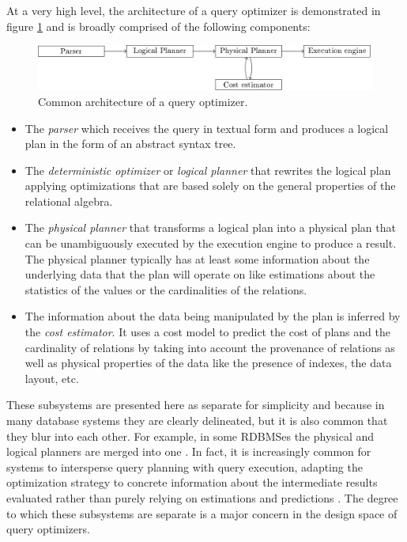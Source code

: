 At a very high level, the architecture of a query optimizer is
demonstrated in figure \ref{fig:optimizer_arch} and is broadly
comprised of the following components:

\begin{figure}[p]
\centering
\includegraphics[width=\textwidth]{./imgs/optimizer_architecture.pdf}
\caption{\label{fig:optimizer_arch}Common architecture of a query
  optimizer.}
\end{figure}

\begin{itemize}

\item The \emph{parser} which receives the query in textual form and
  produces a logical plan in the form of an abstract syntax tree.
\item The \emph{deterministic optimizer} or \emph{logical planner}
  that rewrites the logical plan applying optimizations that are based
  solely on the general properties of the relational algebra.
\item The \emph{physical planner} that transforms a logical plan into
  a physical plan that can be unambiguously executed by the execution
  engine to produce a result. The physical planner typically has at
  least some information about the underlying data that the plan will
  operate on like estimations about the statistics of the values or
  the cardinalities of the relations.
\item The information about the data being manipulated by the plan is
  inferred by the \emph{cost estimator}. It uses a cost model to
  predict the cost of plans and the cardinality of relations by taking
  into account the provenance of relations as well as physical
  properties of the data like the presence of indexes, the data layout,
  etc.
\end{itemize}

These subsystems are presented here as separate for simplicity and
because in many database systems they are clearly delineated, but it is
also common that they blur into each other. For example, in some RDBMSes
the physical and logical planners are merged into one
\cite{graefeCascadesFrameworkQuery1995,shankarQueryOptimizationMicrosoft2012,solimanOrcaModularQuery2014}. In
fact, it is increasingly common for systems to intersperse query
planning with query execution, adapting the optimization strategy
\cite{graefeDynamicQueryEvaluation1989} to concrete information about
the intermediate results evaluated rather than purely relying on
estimations and predictions
\cite{dingPlanStitchHarnessing2018,chaudhuriPayasyougoFrameworkQuery2008,wuSamplingbasedQueryReoptimization2016,herodotouXplusSqltuningawareQuery2010}. The
degree to which these subsystems are separate is a major concern in
the design space of query optimizers.

